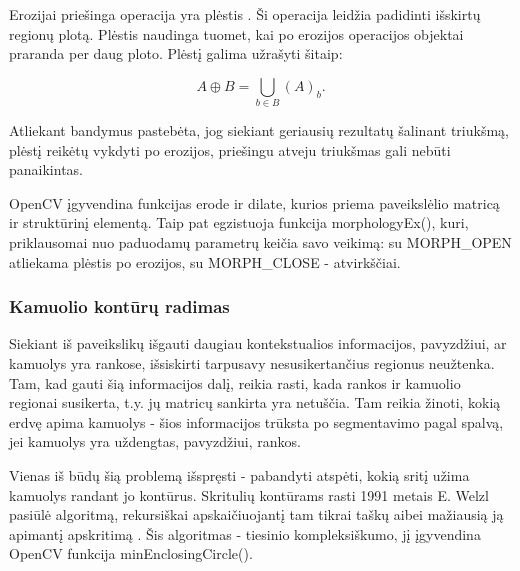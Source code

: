 \documentclass{VUMIFPSbakalaurinis}
\begin{document}
Erozijai priešinga operacija yra plėstis \cite{4767941}. Ši operacija leidžia padidinti išskirtų regionų plotą. Plėstis naudinga tuomet, kai po erozijos operacijos objektai praranda per daug ploto. Plėstį galima užrašyti šitaip:

\begin{equation}\label{eq:plestis}
	A \oplus B = \bigcup_ {b \in B } (A)_{b} .
\end{equation}

Atliekant bandymus pastebėta, jog siekiant geriausių rezultatų šalinant triukšmą, plėstį reikėtų vykdyti po erozijos, priešingu atveju triukšmas gali nebūti panaikintas. 

OpenCV įgyvendina funkcijas erode ir dilate, kurios priema paveikslėlio matricą ir struktūrinį elementą. Taip pat egzistuoja funkcija morphologyEx(), kuri, priklausomai nuo paduodamų parametrų keičia savo veikimą: su MORPH\_OPEN atliekama plėstis po erozijos, su MORPH\_CLOSE - atvirkščiai. 

\subsubsection{Kamuolio kontūrų radimas}

Siekiant iš paveikslikų išgauti daugiau kontekstualios informacijos, pavyzdžiui, ar kamuolys yra rankose, išsiskirti tarpusavy nesusikertančius regionus neužtenka. Tam, kad gauti šią informacijos dalį, reikia rasti, kada rankos ir kamuolio regionai susikerta, t.y. jų matricų sankirta yra netuščia. Tam reikia žinoti, kokią erdvę apima kamuolys - šios informacijos trūksta po segmentavimo pagal spalvą, jei kamuolys yra uždengtas, pavyzdžiui, rankos. 

Vienas iš būdų šią problemą išspręsti - pabandyti atspėti, kokią sritį užima kamuolys randant jo kontūrus. Skritulių kontūrams rasti 1991 metais E. Welzl pasiūlė algoritmą, rekursiškai apskaičiuojantį tam tikrai taškų aibei mažiausią ją apimantį apskritimą \cite{Welzl91smallestenclosing}. Šis algoritmas - tiesinio kompleksiškumo, jį įgyvendina OpenCV funkcija minEnclosingCircle().       
\end{document}

